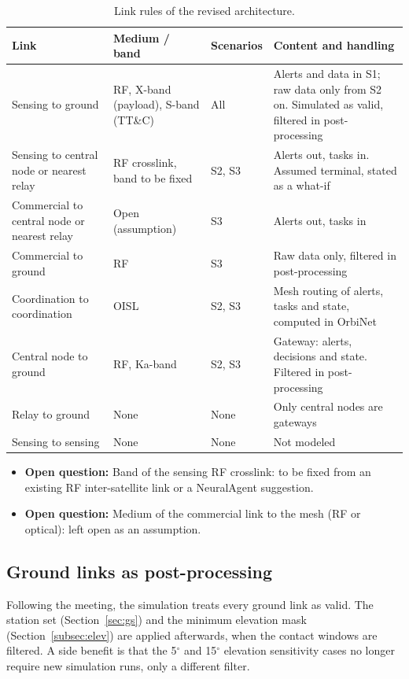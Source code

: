 \documentclass[11pt]{article}
\newcommand{\openquestion}[1]{\textcolor{openq}{\textbf{Open question:}} #1}
\begin{document}
\begin{longtable}{p{3.6cm}p{2.8cm}p{2.0cm}p{5.8cm}}
\caption{Link rules of the revised architecture.}\label{tab:linkrules}\\
\toprule
\textbf{Link} & \textbf{Medium / band} & \textbf{Scenarios} & \textbf{Content and handling} \\
\midrule
\endhead
Sensing to ground & RF, X-band (payload), S-band (TT\&C) & All & Alerts and data in S1; raw data only from S2 on. Simulated as valid, filtered in post-processing \\
Sensing to central node or nearest relay & RF crosslink, band to be fixed & S2, S3 & Alerts out, tasks in. Assumed terminal, stated as a what-if \\
Commercial to central node or nearest relay & Open (assumption) & S3 & Alerts out, tasks in \\
Commercial to ground & RF & S3 & Raw data only, filtered in post-processing \\
Coordination to coordination & OISL & S2, S3 & Mesh routing of alerts, tasks and state, computed in OrbiNet \\
Central node to ground & RF, Ka-band & S2, S3 & Gateway: alerts, decisions and state. Filtered in post-processing \\
Relay to ground & None & None & Only central nodes are gateways \\
Sensing to sensing & None & None & Not modeled \\
\bottomrule
\end{longtable}

\begin{itemize}[leftmargin=1.2cm]
    \item \openquestion{Band of the sensing RF crosslink: to be fixed from an existing RF inter-satellite link or a NeuralAgent suggestion.}
    \item \openquestion{Medium of the commercial link to the mesh (RF or optical): left open as an assumption.}
\end{itemize}

\subsection{Ground links as post-processing}\label{subsec:gs_postproc}

Following the meeting, the simulation treats every ground link as valid. The station set (Section~\ref{sec:gs}) and the minimum elevation mask (Section~\ref{subsec:elev}) are applied afterwards, when the contact windows are filtered. A side benefit is that the 5$^\circ$ and 15$^\circ$ elevation sensitivity cases no longer require new simulation runs, only a different filter.
\end{document}
